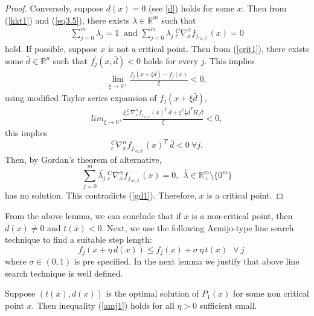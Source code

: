 \documentclass[smallextended,referee,envcountsect]{svjour3}
\begin{document}
\begin{proof}
Conversely, suppose $d(x)=0$ (see \ref{d}) holds for some $x$. Then from (\ref{kkt1}) and (\ref{eq3.5}), there exists $\lambda\in\mathbb{R}^m$ such that 
\begin{eqnarray*}
\sum_{j=0}^{m} \lambda_j=1 ~ \mbox{ and } \sum_{j=0}^m \lambda_j ~{}^C_c\nabla^{\alpha}_x f_{j,_{\alpha,\beta}}(x)=0 \label{gd1}
\end{eqnarray*}
hold. If possible, suppose $x$ is not a critical point. Then from (\ref{crit1}), there exists some $\bar{d}\in\mathbb{R}^n$ such that $f_j^{\prime}(x,\bar{d})<0$ holds for every $j$. This implies 
\begin{align*} 
\underset{\xi \rightarrow 0^+}{\lim} \frac{f_j(x+\xi \bar{d})- f_j(x)}{\xi}<0,
\end{align*}
using modified Taylor series expansion of $f_j(x+\xi \bar{d})$,
\begin{align*} 
lim_{\xi\rightarrow 0^+} \frac{\xi~^C_c\nabla^{\alpha}_x f_{j,_{\alpha,\beta}}(x)^T~\bar{d}+ \xi^2 \frac{1}{2} \bar{d}^T H_j \bar{d}}{\xi}<0,
\end{align*}
this implies $$^C_c\nabla^{\alpha}_xf_{j,_{\alpha,\beta}}(x)^T~\bar{d}<0~\forall j.$$ Then, by Gordan's theorem of alternative, $$\sum_{j=0}^m \bar{\lambda_j}
~{}^C_c\nabla^{\alpha}_x f_{j,_{\alpha,\beta}}(x)=0,~~\bar{\lambda}\in\mathbb{R}^m_+\setminus\{0^m\}$$ has no solution. This contradicts (\ref{gd1}). Therefore, $x$ is a critical point.  
\end{proof}
From the above lemma, we can conclude that if $x$ is a non-critical point, then $d(x)\neq 0$ and $t(x)<0$. Next, we use the following Armijo-type line search technique to find a suitable step length:
\begin{equation}
\quad f_j(x + \eta\, d(x)) \leq f_j(x) + \sigma\, \eta\, t(x) ~~~\forall~j \label{amj1}
\end{equation}
where $\sigma \in(0,1)$ is pre specified. In the next lemma we justify that above line search technique is well defined.
\begin{lemma}
    Suppose $(t(x),d(x))$ is the optimal solution of $P_1(x)$ for some non critical point $x$. Then inequality (\ref{amj1}) holds for all $\eta>0$ sufficient small.
\end{lemma}
\end{document}
